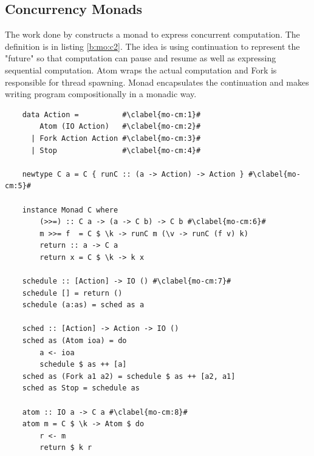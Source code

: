\subsection{Concurrency Monads}
The work done by \cite{claessenFunctionalPearlsPoor1999} constructs a monad to express concurrent computation. The definition is in listing \ref{b:mo:c2}. The idea is using continuation to represent the "future" so that computation can pause and resume as well as expressing sequential computation. Atom wraps the actual computation and Fork is responsible for thread spawning. Monad encapsulates the continuation and makes writing program compositionally in a monadic way.

\begin{code}
  \begin{verbatim}
    data Action =          #\clabel{mo-cm:1}#
        Atom (IO Action)   #\clabel{mo-cm:2}# 
      | Fork Action Action #\clabel{mo-cm:3}# 
      | Stop               #\clabel{mo-cm:4}# 
    
    newtype C a = C { runC :: (a -> Action) -> Action } #\clabel{mo-cm:5}#
    
    instance Monad C where
        (>>=) :: C a -> (a -> C b) -> C b #\clabel{mo-cm:6}#
        m >>= f  = C $ \k -> runC m (\v -> runC (f v) k)
        return :: a -> C a
        return x = C $ \k -> k x
    
    schedule :: [Action] -> IO () #\clabel{mo-cm:7}#
    schedule [] = return ()
    schedule (a:as) = sched as a
    
    sched :: [Action] -> Action -> IO ()
    sched as (Atom ioa) = do
        a <- ioa
        schedule $ as ++ [a] 
    sched as (Fork a1 a2) = schedule $ as ++ [a2, a1]
    sched as Stop = schedule as
    
    atom :: IO a -> C a #\clabel{mo-cm:8}#
    atom m = C $ \k -> Atom $ do
        r <- m
        return $ k r
    

\end{verbatim}
\end{code}

